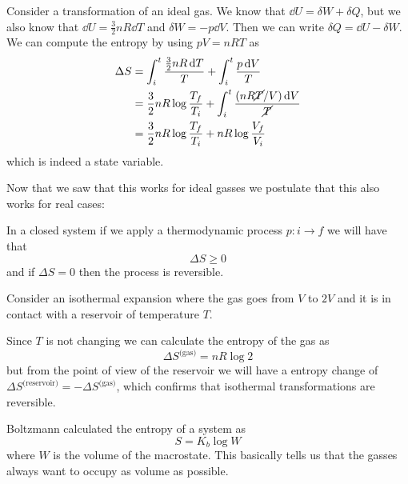 \documentclass[12pt]{extarticle}
\begin{document}
\begin{example}
    Consider a transformation of an ideal gas.
    We know that $\dd{U} = \delta W + \delta Q$, but we also know that $\dd{U} = \frac{3}{2} n R \dd{T}$ and $\delta W = -p \dd{V}$.
    Then we can write $\delta Q = \dd{U} - \delta W$.
    We can compute the entropy by using $pV = nRT$ as
    \begin{align}
        \Delta S & = \int_i^t \frac{\frac{3}{2} n R \dd{T}}{T} + \int_i^t \frac{p \dd{V}}{T}                   \\
                 & = \frac{3}{2} nR \log \frac{T_f}{T_i} + \int_i^t \frac{(nR\cancel{T}/V) \dd{V}}{\cancel{T}} \\
                 & = \frac{3}{2} nR \log \frac{T_f}{T_i} + nR \log \frac{V_f}{V_i}
    \end{align}
    which is indeed a state variable.
\end{example}

Now that we saw that this works for ideal gasses we postulate that this also works for real cases:

\begin{theorem}
    \label{thm:gas:second_principle}
    In a closed system if we apply a thermodynamic process $p: i \to f$ we will have that
    \begin{equation}
        \Delta S \geq 0
    \end{equation}
    and if $\Delta S = 0$ then the process is reversible.
\end{theorem}

\begin{example}
    Consider an isothermal expansion where the gas goes from $V$ to $2V$ and it is in contact with a reservoir of temperature $T$.

    Since $T$ is not changing we can calculate the entropy of the gas as
    \begin{equation}
        \Delta S^{\text{(gas)}} = n R \log 2
    \end{equation}
    but from the point of view of the reservoir we will have a entropy change of $\Delta S^{\text{(reservoir)}} = - \Delta S^{\text{(gas)}}$, which confirms that isothermal transformations are reversible.
\end{example}

Boltzmann calculated the entropy of a system as
\begin{equation}
    S = K_b \log W
\end{equation}
where $W$ is the volume of the macrostate.
This basically tells us that the gasses always want to occupy as volume as possible.
\end{document}
